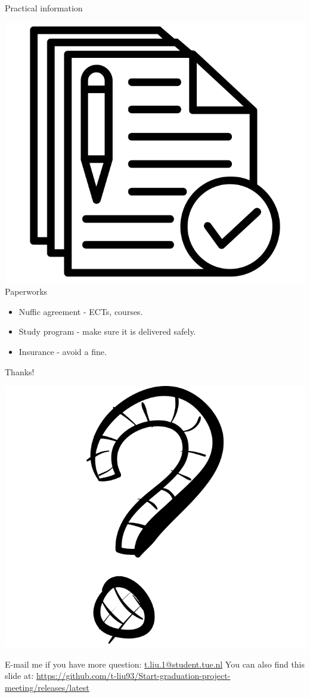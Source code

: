 \documentclass[12pt, aspectratio=43]{beamer}
\begin{document}
\begin{frame}{Practical information}
\begin{center}
    \includegraphics[scale=0.25]{images/Paperwork.png} \\
    Paperworks
\end{center}
\begin{itemize}
    \item Nuffic agreement - ECTs, courses.
    \item Study program - make sure it is delivered safely.
    \item Insurance - avoid a fine. 
\end{itemize}
\end{frame}

\begin{frame}{Thanks!}
\begin{center}
    \includegraphics[scale=0.17]{images/Question.png}
\end{center}
E-mail me if you have more question: \href{mailto:t.liu.1@student.tue.nl}{t.liu.1@student.tue.nl}
\bigbreak
You can also find this slide at:
\url{https://github.com/t-liu93/Start-graduation-project-meeting/releases/latest}
\end{frame}
\end{document}

